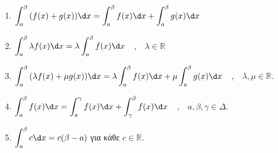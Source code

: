 \documentclass[a4paper,11pt,twoside]{article}
\begin{document}
\begin{enumerate}
\item $\displaystyle\int_{a}^{\beta}{(f(x)+g(x))\d x}=\int_{a}^{\beta}{f(x)\d x}+\int_{a}^{\beta}{g(x)\d x}$
\item $\displaystyle\int_{a}^{\beta}{\lambda f(x)\d x}=\lambda\int_{a}^{\beta}{f(x)\d x}$\ \ ,\ \ $\lambda\in\mathbb{R}$
\item $\displaystyle\int_{a}^{\beta}{(\lambda f(x)+\mu g(x))\d x}=\lambda\int_{a}^{\beta}{f(x)\d x}+\mu\int_{a}^{\beta}{g(x)\d x}$\ \ ,\ \ $\lambda,\mu\in\mathbb{R}$.
\item $\displaystyle\int_{a}^{\beta}{f(x)\d x}=\int_{a}^{\gamma}{f(x)\d x}+\int_{\gamma}^{\beta}{f(x)\d x}$\ \ ,\ \ $a,\beta,\gamma\in\Delta$.
\item $\displaystyle\int_{a}^{\beta}{c\d x}=c(\beta-a)$ για κάθε $c\in\mathbb{R}$.
\end{enumerate}
\newpage
\end{document}
